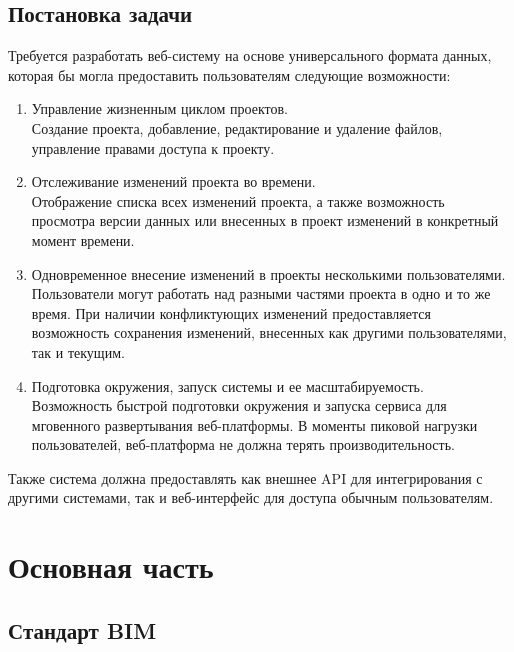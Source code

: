 \documentclass[a4paper,14pt]{extreport} %
\begin{document}
\newpage 
\section{Постановка задачи}

Требуется разработать веб-систему на основе универсального формата данных, которая бы могла предоставить пользователям следующие возможности:
\begin{enumerate}
\item Управление жизненным циклом проектов. \\
Создание проекта, добавление, редактирование  и удаление файлов, управление правами доступа к проекту.
\item Отслеживание изменений проекта во времени. \\
Отображение списка всех изменений проекта, а также возможность просмотра версии данных или внесенных в проект изменений в конкретный момент времени.
\item Одновременное внесение изменений в проекты несколькими пользователями. \\
Пользователи могут работать над разными частями проекта в одно и то же время. При наличии конфликтующих изменений предоставляется возможность сохранения изменений, внесенных как другими пользователями, так и текущим.
\item Подготовка окружения, запуск системы и ее масштабируемость. \\
Возможность быстрой подготовки окружения и запуска сервиса для мговенного развертывания веб-платформы. В моменты пиковой нагрузки пользователей, веб-платформа не должна терять производительность.
\end{enumerate}
Также система должна предоставлять как внешнее API для интегрирования с другими системами, так и веб-интерфейс для доступа обычным пользователям.

\newpage

\chapter{Основная часть}
\section{Стандарт BIM}
\end{document}
